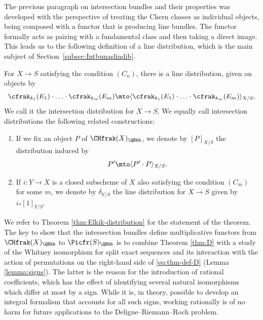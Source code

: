 The previous paragraph on intersection bundles and their properties was developed with the perspective of treating the Chern classes as individual objects, being composed with a functor that is producing line bundles. The functor formally acts as pairing with a fundamental class and then taking a direct image. This leads us to the following definition of a line distribution, which is the main subject of Section~\ref{subsec:Intbunaslindib}.

\begin{defthm}
For $X \to S$ satisfying the condition $(C_{n})$, there is a line distribution, given on objects by
\begin{equation}\label{eq:thm-def-D}
\cfrak_{k_1}(E_1) \cdot \ldots \cdot \cfrak_{k_m}(E_m) \mto \langle \cfrak_{k_1}(E_1) \cdot \ldots \cdot \cfrak_{k_m}(E_m) \rangle_{X/S}.
\end{equation}
We call it the intersection distribution for $X\to S$. We equally call intersection distributions the following related constructions:

\begin{enumerate}
\item If we fix an object $P$ of $\CHfrak(X)_\QBbb$, we denote by $[P]_{X/S}$ the distribution induced by
\begin{displaymath}
P^{\prime} \mto \langle P^{\prime} \cdot P \rangle_{X/S}.
\end{displaymath}
\item If $i\colon Y \to X$ is a closed subscheme of $X$ also satisfying the condition $(C_m)$ for some $m$, we denote by $\delta_{Y/S}$ the line distribution for $X\to S$ given by $ i_\ast [1]_{Y/S}$.
\end{enumerate}

\end{defthm}
We refer to Theorem \ref{thm:Elkik-distribution} for the statement of the theorem. The key to show that the intersection bundles define multiplicative functors from $\CHfrak(X)_{\QBbb}$ to $\Picfr(S)_{\QBbb}$ is to combine Theorem \ref{thm:D} with a study of the Whitney isomorphism for split exact sequences and its interaction with the action of permutations on the right-hand side of \eqref{eq:thm-def-D} (\cf Lemma \ref{lemma:signs}). The latter is the reason for the introduction of rational coefficients, which has the effect of identifying several natural isomorphisms which differ at most by a sign. While it is, in theory, possible to develop an integral formalism that accounts for all such signs, working rationally is of no harm for future applications to the Deligne--Riemann--Roch problem.


